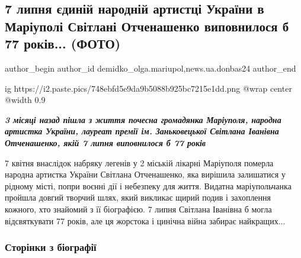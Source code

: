  
 
 
 
 
 
\subsection{7 липня єдиній народній артистці України в Маріуполі Світлані Отченашенко виповнилося б 77 років... (ФОТО)}
\label{sec:07_07_2022.stz.news.ua.donbas24.1.otchenashenko_77_rokiv}
 
\ifcmt
 author_begin
   author_id demidko_olga.mariupol,news.ua.donbas24
 author_end
\fi

\ifcmt
  ig https://i2.paste.pics/748ebfd5e9da9b5088b925bc7215e1dd.png
  @wrap center
  @width 0.9
\fi

\begin{center}
  \em\color{blue}\bfseries\Large
3 місяці назад пішла з життя почесна громадянка Маріуполя, народна артистка
України, лауреат премії ім. Заньковецької Світлана Іванівна
Отченашенко, якій 7 липня виповнилося б 77 років
\end{center}

7 квітня внаслідок набряку легенів у 2 міській лікарні Маріуполя померла
народна артистка України Світлана Отченашенко, яка вирішила залишатися у
рідному місті, попри воєнні дії і небезпеку для життя. Видатна маріупольчанка
пройшла довгий творчий шлях, який викликає щирий подив і захоплення кожного,
хто знайомий з її біографією. 7 липня Світлана Іванівна б могла відсвяткувати
77 років, але ця жорстока і цинічна війна забирає найкращих... 

\subsubsection{Сторінки з біографії}

